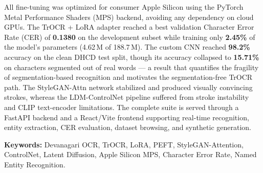 \documentclass[12pt,a4paper]{report}
\begin{document}
All fine-tuning was optimized for consumer Apple Silicon using the PyTorch Metal Performance Shaders (MPS) backend, avoiding any dependency on cloud GPUs. The TrOCR + LoRA adapter reached a best validation Character Error Rate (CER) of \textbf{0.1380} on the development subset while training only \textbf{2.45\%} of the model's parameters (4.62\,M of 188.7\,M). The custom CNN reached \textbf{98.2\%} accuracy on the clean DHCD test split, though its accuracy collapsed to \textbf{15.71\%} on characters segmented out of real words --- a result that quantifies the fragility of segmentation-based recognition and motivates the segmentation-free TrOCR path. The StyleGAN-Attn network stabilized and produced visually convincing strokes, whereas the LDM-ControlNet pipeline suffered from stroke instability and CLIP text-encoder limitations. The complete suite is served through a FastAPI backend and a React/Vite frontend supporting real-time recognition, entity extraction, CER evaluation, dataset browsing, and synthetic generation.

\vspace{0.4cm}
\noindent\textbf{Keywords:} Devanagari OCR, TrOCR, LoRA, PEFT, StyleGAN-Attention, ControlNet, Latent Diffusion, Apple Silicon MPS, Character Error Rate, Named Entity Recognition.

\tableofcontents
\end{document}
